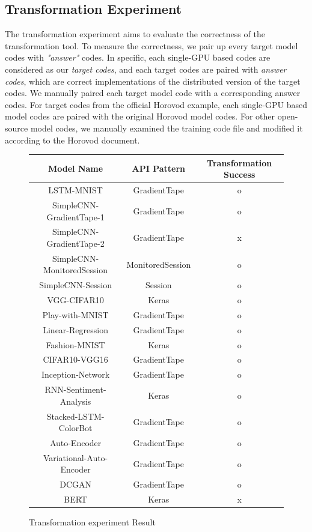 \subsection{Transformation Experiment}

The transformation experiment aims to evaluate the correctness of the
transformation tool. To measure the correctness, we pair up every
target model codes with \textit{"answer"} codes. In specific,      
each single-GPU based codes are considered as our \textit{target codes},
and each target codes are paired with \textit{answer codes}, which are
correct implementations of the distributed version of the target codes. 
We manually paired each target model code with a corresponding answer codes.
For target codes from the official Horovod example, each single-GPU based
model codes are paired with the original Horovod model codes.     
For other open-source model codes, we manually examined the training code
file and modified it according to the Horovod document.


\begin{figure}[!ht]
  \begin{center}
  \begin{tabular}{|c|c|c|}
    \hline
    Model Name & API Pattern & Transformation Success \\
    \hline
    LSTM-MNIST & GradientTape & o \\
    SimpleCNN-GradientTape-1 & GradientTape & o\\
    SimpleCNN-GradientTape-2 & GradientTape & x \\
    SimpleCNN-MonitoredSession & MonitoredSession &o\\
    SimpleCNN-Session & Session & o\\
    VGG-CIFAR10 & Keras & o \\ 
    Play-with-MNIST & GradientTape & o \\
    Linear-Regression & GradientTape & o \\
    Fashion-MNIST & Keras & o \\
    CIFAR10-VGG16 & GradientTape & o\\
    Inception-Network & GradientTape & o \\
    RNN-Sentiment-Analysis & Keras & o \\
    Stacked-LSTM-ColorBot & GradientTape & o \\
    Auto-Encoder & GradientTape & o \\
    Variational-Auto-Encoder & GradientTape & o \\
    DCGAN & GradientTape & o \\
    BERT & Keras & x \\
    \hline
  \end{tabular}
  \end{center}
  \caption{Transformation experiment Result}
  \label{fig:eval:trans}
\end{figure}

